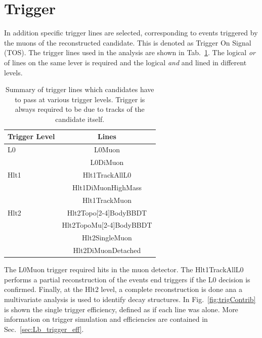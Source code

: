 \section{Trigger}

In addition specific trigger lines are selected, corresponding to events triggered by the muons
of the reconstructed candidate. This is denoted as Trigger On Signal (TOS).
The trigger lines used in the analysis are shown in Tab.~\ref{tab:Lb_triggerLines}.
The logical {\em or } of lines on the same lever is required and the logical {\em and }
and lined in different levels.
%
\begin{table}
\centering
\caption{Summary of trigger lines which candidates have to pass at various trigger levels.
Trigger is always required to be due to tracks of the candidate itself.}
\begin{tabular}{lc} \hline\hline
Trigger Level &  Lines   \\ \hline
L0            & L0Muon  \\
              & L0DiMuon \\ \hline
Hlt1          & Hlt1TrackAllL0 \\ 
              & Hlt1DiMuonHighMass     \\
              & Hlt1TrackMuon      \\ \hline
Hlt2          & Hlt2Topo[2-4]BodyBBDT  \\
              & Hlt2TopoMu[2-4]BodyBBDT\\
              & Hlt2SingleMuon     \\
              & Hlt2DiMuonDetached \\ \hline\hline
\end{tabular}
\label{tab:Lb_triggerLines}
\end{table}
%
The L0Muon trigger required hits in the muon detector. The Hlt1TrackAllL0 performs a partial
reconstruction of the events end triggers if the L0 decision is confirmed. Finally,
at the Hlt2 level, a complete reconstruction is done ana a multivariate analysis is 
used to identify decay structures. In Fig.~\ref{fig:trigContrib} is shown the single trigger
efficiency, defined as if each line was alone.
More information on trigger simulation and efficiencies are contained in Sec.~\ref{sec:Lb_trigger_eff}.

